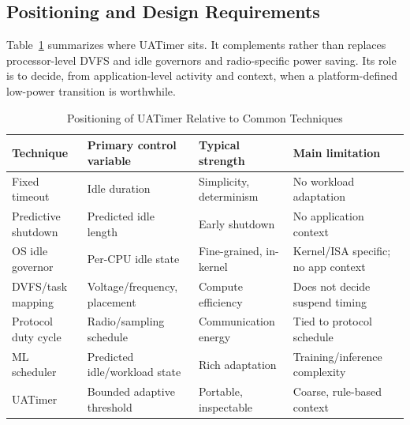 \documentclass[journal]{IEEEtran}
\begin{document}
\subsection{Positioning and Design Requirements}
Table~\ref{tab:positioning} summarizes where UATimer sits. It complements rather than replaces processor-level DVFS and idle governors and radio-specific power saving. Its role is to decide, from application-level activity and context, when a platform-defined low-power transition is worthwhile.

\begin{table}[t]
\caption{Positioning of UATimer Relative to Common Techniques}
\label{tab:positioning}
\centering
\scriptsize
\setlength{\tabcolsep}{2.2pt}
\begin{tabular}{>{\raggedright\arraybackslash}p{}>{\raggedright\arraybackslash}p{}>{\raggedright\arraybackslash}p{}>{\raggedright\arraybackslash}p{}}
\toprule
Technique & Primary control variable & Typical strength & Main limitation \\
\midrule
Fixed timeout & Idle duration & Simplicity, determinism & No workload adaptation \\
Predictive shutdown & Predicted idle length & Early shutdown & No application context \\
OS idle governor & Per-CPU idle state & Fine-grained, in-kernel & Kernel/ISA specific; no app context \\
DVFS/task mapping & Voltage/frequency, placement & Compute efficiency & Does not decide suspend timing \\
Protocol duty cycle & Radio/sampling schedule & Communication energy & Tied to protocol schedule \\
ML scheduler & Predicted idle/workload state & Rich adaptation & Training/inference complexity \\
UATimer & Bounded adaptive threshold & Portable, inspectable & Coarse, rule-based context \\
\bottomrule
\end{tabular}
\end{table}
\end{document}
